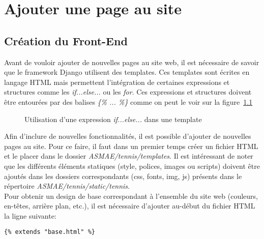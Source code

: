 \chapter{Ajouter une page au site}
\label{ajouter une page}

\section{Création du Front-End}

Avant de vouloir ajouter de nouvelles pages au site web, il est nécessaire de savoir que le framework Django utilisent des templates. Ces templates sont écrites en langage HTML mais permettent l'intégration de certaines expressions et structures comme les \textit{if...else...} ou les \textit{for}. Ces expressions et structures doivent être entourées par des balises \textit{\{\% ... \%\}} comme on peut le voir sur la figure~\ref{fig:Utilisation d'une expression if...else... dans une template}\\


\begin{figure}[!ht]
\centering

\caption{Utilisation d'une expression \textit{if...else...} dans une template}
\label{fig:Utilisation d'une expression if...else... dans une template}
\end{figure}
\FloatBarrier

Afin d'inclure de nouvelles fonctionnalités, il est possible d'ajouter de nouvelles pages au site. Pour ce faire, il faut dans un premier temps créer un fichier HTML et le placer dans le dossier \textit{ASMAE/tennis/templates}. Il est intéressant de noter que les différents éléments statiques (style, polices, images ou scripts) doivent être ajoutés dans les dossiers correspondants (css, fonts, img, js)  présents dans le répertoire \textit{ASMAE/tennis/static/tennis}.\\

Pour obtenir un design de base correspondant à l'ensemble du site web (couleurs, en-têtes, arrière plan, etc.), il est nécessaire d'ajouter au-début du fichier HTML la ligne suivante:

\begin{verbatim}
{% extends "base.html" %}
\end{verbatim}

